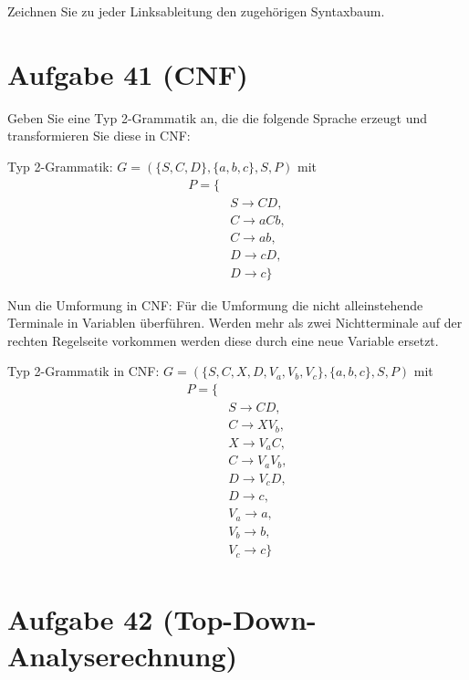 \documentclass{article}
\begin{document}
Zeichnen Sie zu jeder Linksableitung den zugehörigen Syntaxbaum.


\section*{Aufgabe 41 (CNF)}

Geben Sie eine Typ 2-Grammatik an, die die folgende Sprache erzeugt und transformieren Sie
diese in CNF:

Typ 2-Grammatik:
$G = (\{S, C, D\}, \{a, b, c\}, S, P)$ mit
\begin{equation}
\begin{split}
P = \{ \\\
&S \rightarrow CD, \\\
&C \rightarrow aCb, \\\
&C \rightarrow ab, \\\
&D \rightarrow cD, \\\
&D \rightarrow c \}
\end{split}
\end{equation}

Nun die Umformung in CNF:
Für die Umformung die nicht alleinstehende Terminale in Variablen überführen. Werden mehr als zwei Nichtterminale auf der rechten Regelseite vorkommen werden diese durch eine neue Variable ersetzt.

Typ 2-Grammatik in CNF:
$G = (\{S, C, X, D, V_a, V_b, V_c\}, \{a, b, c\}, S, P)$ mit
\begin{equation}
\begin{split}
P = \{ \\\
&S \rightarrow CD, \\
&C \rightarrow XV_b, \\\
&X \rightarrow V_aC, \\\
&C \rightarrow V_aV_b, \\\
&D \rightarrow V_cD, \\\
&D \rightarrow c, \\\
&V_a \rightarrow a, \\\
&V_b \rightarrow b, \\\
&V_c \rightarrow c \} \\\
\end{split}
\end{equation}


\section*{Aufgabe 42 (Top-Down-Analyserechnung)}
\end{document}
